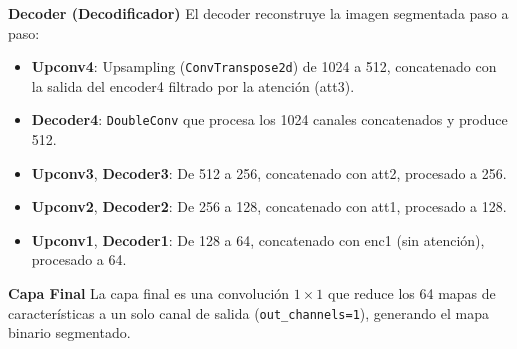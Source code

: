 \begin{enumerate}
\begin{itemize}
\textbf{Decoder (Decodificador)}
El decoder reconstruye la imagen segmentada paso a paso:
\begin{itemize}
    \item \textbf{Upconv4}: Upsampling (\texttt{ConvTranspose2d}) de 1024 a 512, concatenado con la salida del encoder4 filtrado por la atención (att3).
    \item \textbf{Decoder4}: \texttt{DoubleConv} que procesa los 1024 canales concatenados y produce 512.
    \item \textbf{Upconv3}, \textbf{Decoder3}: De 512 a 256, concatenado con att2, procesado a 256.
    \item \textbf{Upconv2}, \textbf{Decoder2}: De 256 a 128, concatenado con att1, procesado a 128.
    \item \textbf{Upconv1}, \textbf{Decoder1}: De 128 a 64, concatenado con enc1 (sin atención), procesado a 64.
\end{itemize}

\textbf{Capa Final}
La capa final es una convolución $1\times1$ que reduce los 64 mapas de características a un solo canal de salida (\texttt{out\_channels=1}), generando el mapa binario segmentado.

  
  
  
  
  
  

\end{itemize}
\end{enumerate}
